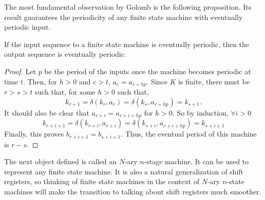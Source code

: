 
\par The most fundamental observation by Golomb is the following proposition.
Its result guarantees the periodicity of any finite state machine with
eventually periodic input.

\begin{proposition}\label{prop:golomb-2}
  If the input sequence to a finite state machine is eventually periodic, then
  the output sequence is eventually periodic.
\end{proposition}
\begin{proof}
  Let $p$ be the period of the inputs once the machine becomes periodic at time
  $t$. Then, for $h>0$ and $c>t$, $a_c=a_{c+hp}$. Since $K$ is finite, there
  must be $r>s>t$ such that, for some $h>0$ such that,
  \[
  k_{r+1}=\delta(k_r,a_r)=\delta(k_s,a_{r+hp})=k_{s+1}.
  \]
  It should also be clear that $a_{r+i}=a_{r+i+hp}$ for $h>0$. So by induction,
  $\forall i>0$
  \[
  k_{r+i+1}=\delta(k_{r+i},a_{r+i})=\delta(k_{s+i},a_{r+i+hp})=k_{s+i+1}
  \]
  Finally, this proves $b_{r+i+1}=b_{s+i+1}$. Thus, the eventual period of this
  machine is $r-s$.
\end{proof}

\par The next object defined is called an $N$-ary $n$-stage machine. It can be
used to represent any finite state machine. It is also a natural generalization
of shift registers, so thinking of finite state machines in the context of
$N$-ary $n$-state machines will make the transition to talking about shift
registers much smoother.

